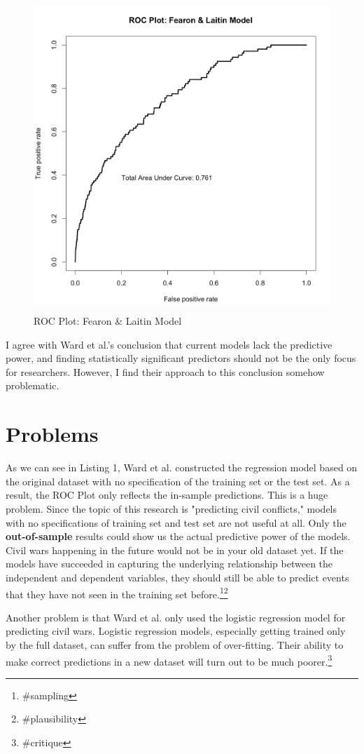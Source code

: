 \documentclass{article}
\begin{document}
\begin{figure}[h!]
    \centering
    \includegraphics[width=0.5\linewidth]{roc1.png}
    \caption{ROC Plot: Fearon \& Laitin Model}
    \label{roc1}
\end{figure}

I agree with Ward et al.'s conclusion that current models lack the predictive power, and finding statistically significant predictors should not be the only focus for researchers. However, I find their approach to this conclusion somehow problematic. 

\section{Problems}

As we can see in Listing 1, Ward et al. constructed the regression model based on the original dataset with no specification of the training set or the test set. As a result, the ROC Plot only reflects the in-sample predictions. This is a huge problem. Since the topic of this research is "predicting civil conflicts," models with no specifications of training set and test set are not useful at all. Only the \textbf{out-of-sample} results could show us the actual predictive power of the models. Civil wars happening in the future would not be in your old dataset yet. If the models have succeeded in capturing the underlying relationship between the independent and dependent variables, they should still be able to predict events that they have not seen in the training set before.\footnote{\#sampling}\footnote{\#plausibility}

Another problem is that Ward et al. only used the logistic regression model for predicting civil wars. Logistic regression models, especially getting trained only by the full dataset, can suffer from the problem of over-fitting. Their ability to make correct predictions in a new dataset will turn out to be much poorer.\footnote{\#critique}
\end{document}
